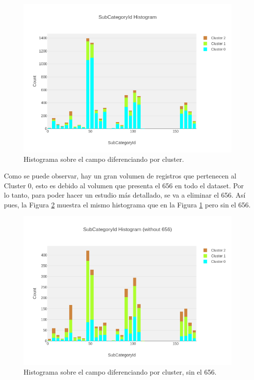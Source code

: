 \begin{figure}[!th]
\includegraphics[scale=0.5]{figures/histogram-subcategoryid-per-cluster}
\centering
\caption{Histograma sobre el campo  diferenciando por cluster.}
\label{fig:histogram-subcategoryid-per-cluster}
\end{figure}


Como se puede observar, hay un gran volumen de registros que pertenecen al Cluster 0, esto es debido al volumen que presenta el  656 en todo el dataset. Por lo tanto, para poder hacer un estudio más detallado, se va a eliminar el  656. Así pues, la Figura \ref{fig:histogram-subcategoryid-per-cluster-without656} muestra el mismo histograma que en la Figura \ref{fig:histogram-subcategoryid-per-cluster} pero sin el  656. 

\begin{figure}[!th]
\includegraphics[scale=0.5]{figures/histogram-subcategoryid-per-cluster-without656}
\centering
\caption{Histograma sobre el campo  diferenciando por cluster, sin el  656.}
\label{fig:histogram-subcategoryid-per-cluster-without656}
\end{figure}

